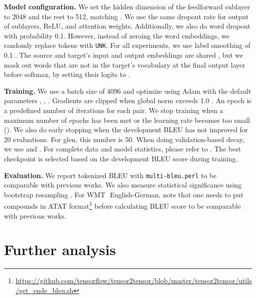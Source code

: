 \documentclass[11pt,a4paper]{article}
\newcommand{\glTOen}{gl\textrightarrow en}
\newcommand{\WMT}{WMT\,\textquotesingle 14}
\renewcommand{\paragraph}[1]{\par\medskip\noindent\textbf{#1}}
\begin{document}
\paragraph{Model configuration.} We set the hidden dimension of the feedforward sublayer to 2048 and the rest to 512, matching \citet{NIPS2017_7181}. We use the same dropout rate for output of sublayers, ReLU, and attention weights. Additionally, we also do word dropout \cite{Sennrich2016dropout} with probability 0.1. However, instead of zeroing the word embeddings, we randomly replace tokens with \texttt{UNK}. For all experiments, we use label smoothing of 0.1 \cite{label_smoothing_1, label_smoothing_2}. The source and target's input and output embeddings are shared \cite{tiedembed}, but we mask out words that are not in the target's vocabulary at the final output layer before softmax, by setting their logits to .

\paragraph{Training.} We use a batch size of 4096 and optimize using Adam \cite{Kingma2014} with the default parameters , , . Gradients are clipped when global norm exceeds 1.0 \cite{Pascanu2013}. An epoch is a predefined number of iterations for each pair. We stop training when a maximum number of epochs has been met or the learning rate becomes too small (). We also do early stopping when the development BLEU has not improved for 20 evaluations. For \glTOen, this number is 50. When doing validation-based decay, we use  and . For complete data and model statistics, please refer to . The best checkpoint is selected based on the development BLEU score during training.

\paragraph{Evaluation.} We report tokenized BLEU \cite{papineni-etal-2002-bleu} with \texttt{multi-bleu.perl} to be comparable with previous works. We also measure statistical significance using bootstrap resampling \cite{Koehn2004}. For \WMT\ English-German, note that one needs to put compounds in ATAT format\footnote{\url{https://github.com/tensorflow/tensor2tensor/blob/master/tensor2tensor/utils/get_ende_bleu.sh}} before calculating BLEU score to be comparable with previous works.\\

\section{Further analysis}
\label{ssec:generalization}
\end{document}
